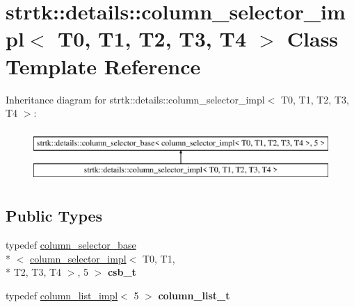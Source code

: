 \hypertarget{classstrtk_1_1details_1_1column__selector__impl_3_01T0_00_01T1_00_01T2_00_01T3_00_01T4_01_4}{\section{strtk\-:\-:details\-:\-:column\-\_\-selector\-\_\-impl$<$ T0, T1, T2, T3, T4 $>$ Class Template Reference}
\label{classstrtk_1_1details_1_1column__selector__impl_3_01T0_00_01T1_00_01T2_00_01T3_00_01T4_01_4}
}
Inheritance diagram for strtk\-:\-:details\-:\-:column\-\_\-selector\-\_\-impl$<$ T0, T1, T2, T3, T4 $>$\-:\begin{figure}[H]
\begin{center}
\leavevmode
\includegraphics[height=2.000000cm]{classstrtk_1_1details_1_1column__selector__impl_3_01T0_00_01T1_00_01T2_00_01T3_00_01T4_01_4}
\end{center}
\end{figure}
\subsection*{Public Types}
\begin{DoxyCompactItemize}
\item 
\hypertarget{classstrtk_1_1details_1_1column__selector__impl_3_01T0_00_01T1_00_01T2_00_01T3_00_01T4_01_4_a60ba2340e8915b8b5e2312a18080f09b}{typedef \hyperlink{classstrtk_1_1details_1_1column__selector__base}{column\-\_\-selector\-\_\-base}\\*
$<$ \hyperlink{classstrtk_1_1details_1_1column__selector__impl}{column\-\_\-selector\-\_\-impl}$<$ T0, T1, \\*
T2, T3, T4 $>$, 5 $>$ {\bfseries csb\-\_\-t}}\label{classstrtk_1_1details_1_1column__selector__impl_3_01T0_00_01T1_00_01T2_00_01T3_00_01T4_01_4_a60ba2340e8915b8b5e2312a18080f09b}

\item 
\hypertarget{classstrtk_1_1details_1_1column__selector__impl_3_01T0_00_01T1_00_01T2_00_01T3_00_01T4_01_4_aa2e8195741e61d214e687fbc0f304494}{typedef \hyperlink{structstrtk_1_1details_1_1column__list__impl}{column\-\_\-list\-\_\-impl}$<$ 5 $>$ {\bfseries column\-\_\-list\-\_\-t}}\label{classstrtk_1_1details_1_1column__selector__impl_3_01T0_00_01T1_00_01T2_00_01T3_00_01T4_01_4_aa2e8195741e61d214e687fbc0f304494}

\end{DoxyCompactItemize}

